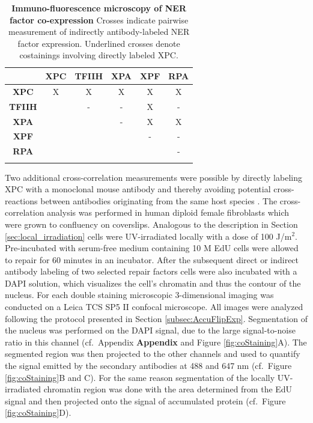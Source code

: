 \begin{table}[h!]
	\centering
	\begin{tabular}{cccccc}
		\hline
			\rule{0pt}{2ex}
			&\textbf{XPC} & \textbf{TFIIH} & \textbf{XPA} & \textbf{XPF} & \textbf{RPA}\\ \hline
			\rule{0pt}{3ex}
\textbf{XPC}&        X    &           X    & X            &         X    & X            \\ \hline
			\rule{0pt}{3ex}
\textbf{TFIIH}&           & -              & -            & X            & -             \\ \hline
			\rule{0pt}{3ex}
\textbf{XPA}&             &                & -            & X            & X             \\ \hline
			\rule{0pt}{3ex}
\textbf{XPF}&             &                &              & -            & -              \\ \hline
			\rule{0pt}{3ex}
\textbf{RPA}&             &                &              &              & -               \\ \hline
			\rule{0pt}{3ex}
		
	\end{tabular}
	\caption{\textbf{Immuno-fluorescence microscopy of NER factor co-expression} Crosses indicate pairwise measurement of indirectly antibody-labeled NER factor expression. Underlined crosses denote costainings involving directly labeled XPC. }\label{tab:co-staining}
\end{table}   


Two additional cross-correlation measurements were possible by directly labeling XPC with a monoclonal mouse antibody and thereby avoiding potential cross-reactions between antibodies originating from the same host species \cite{Burry2011,Giepmans2006}. The cross-correlation analysis was performed in	human diploid female fibroblasts which were grown to confluency on coverslips. Analogous to the description in Section \ref{sec:local_irradiation} cells were UV-irradiated locally with a dose of 100 J/$\text{m}^\text{2}$. Pre-incubated with serum-free medium containing 10 \textmu M EdU cells were allowed to repair for 60 minutes in an incubator. After the subsequent direct or indirect antibody labeling of two selected repair factors cells were also incubated with a DAPI solution, which visualizes the cell's chromatin and thus the contour of the nucleus. For each double staining microscopic 3-dimensional imaging was conducted on a Leica TCS SP5 II confocal microscope. All images were analyzed following the protocol presented in Section \ref{subsec:AccuFlipExp}. Segmentation of the nucleus was performed on the DAPI signal, due to the large signal-to-noise ratio in this channel (cf.\ Appendix \textbf{Appendix} and Figure \ref{fig:coStaining}A). The segmented region was then projected to the other channels and used to quantify the signal emitted by the secondary antibodies at 488 and 647 nm (cf.\ Figure \ref{fig:coStaining}B and C). For the same reason segmentation of the locally UV-irradiated chromatin region was done with the area determined from the EdU signal and then projected onto the signal of accumulated protein (cf.\ Figure \ref{fig:coStaining}D).   


